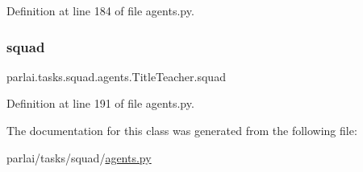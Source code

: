 Definition at line 184 of file agents.\+py.

\mbox{\label{classparlai_1_1tasks_1_1squad_1_1agents_1_1TitleTeacher_a416d2c1d7eb4e93ba1dc213cba6d2d26}} 
\subsubsection{\texorpdfstring{squad}{squad}}
{\footnotesize\ttfamily parlai.\+tasks.\+squad.\+agents.\+Title\+Teacher.\+squad}



Definition at line 191 of file agents.\+py.



The documentation for this class was generated from the following file\+:\begin{DoxyCompactItemize}
\item 
parlai/tasks/squad/\hyperlink{parlai_2tasks_2squad_2agents_8py}{agents.\+py}\end{DoxyCompactItemize}
